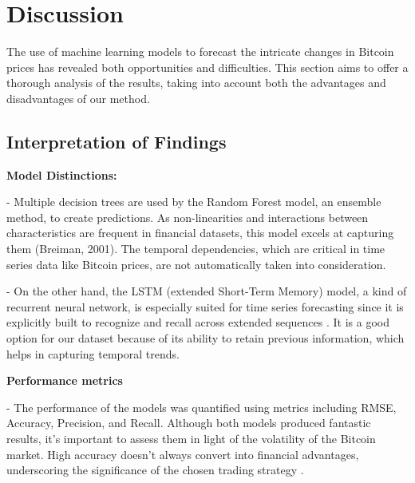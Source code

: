\def\baselinestretch{1}

\chapter{Discussion}

\def\baselinestretch{1.44}

The use of machine learning models to forecast the intricate changes in Bitcoin prices has revealed both opportunities and difficulties. This section aims to offer a thorough analysis of the results, taking into account both the advantages and disadvantages of our method.

\section{Interpretation of Findings}

\textbf{Model Distinctions:}

-	Multiple decision trees are used by the Random Forest model, an ensemble method, to create predictions. As non-linearities and interactions between characteristics are frequent in financial datasets, this model excels at capturing them (Breiman, 2001). The temporal dependencies, which are critical in time series data like Bitcoin prices, are not automatically taken into consideration.

-	On the other hand, the LSTM (extended Short-Term Memory) model, a kind of recurrent neural network, is especially suited for time series forecasting since it is explicitly built to recognize and recall across extended sequences \citep{Hochreiter1997LongSM}. It is a good option for our dataset because of its ability to retain previous information, which helps in capturing temporal trends.

\textbf{Performance metrics}

-	The performance of the models was quantified using metrics including RMSE, Accuracy, Precision, and Recall. Although both models produced fantastic results, it's important to assess them in light of the volatility of the Bitcoin market. High accuracy doesn't always convert into financial advantages, underscoring the significance of the chosen trading strategy \citep{bao2017deep}.

